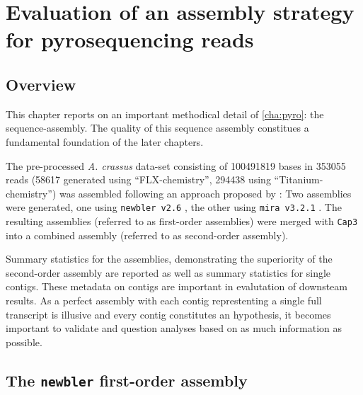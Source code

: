 
\chapter{Evaluation of an assembly strategy for pyrosequencing
  reads} %



\ifpdf
    \graphicspath{{4_eval_ass/figures/PNG/}{4_eval_ass/figures/PDF/}{4_eval_ass/figures/}}
\else
    \graphicspath{{4_eval_ass/figures/EPS/}{4_eval_ass/figures/}}
\fi



\section{Overview}
\label{sec:over-eval}

This chapter reports on an important methodical detail of
\ref{cha:pyro}: the sequence-assembly. The quality of this sequence
assembly constitues a fundamental foundation of the later
chapters. 

The pre-processed \textit{A. crassus} data-set consisting of 100491819
bases in 353055 reads (58617 generated using ``FLX-chemistry'', 294438
using ``Titanium-chemistry'') was assembled following an approach
proposed by \cite{pmid20950480}: Two assemblies were generated, one
using \texttt{newbler v2.6} \cite{pmid16056220}, the other using
\texttt{mira v3.2.1} \cite{miraEST}. The resulting assemblies
(referred to as first-order assemblies) were merged with \texttt{Cap3}
\cite{Cap3_Huang} into a combined assembly (referred to as
second-order assembly). 

Summary statistics for the assemblies, demonstrating the superiority
of the second-order assembly are reported as well as summary
statistics for single contigs. These metadata on contigs are important
in evalutation of downsteam results. As a perfect assembly with each
contig represtenting a single full transcript is illusive and every
contig constitutes an hypothesis, it becomes important to validate and
question analyses based on as much information as possible.

\section{The \texttt{newbler} first-order assembly}
\label{sec:new-fist}


